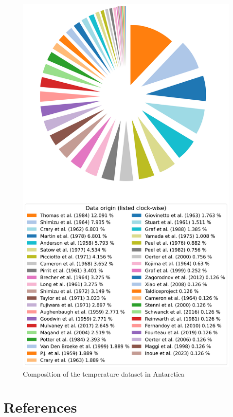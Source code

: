 \documentclass[journal abbreviation, manuscript]{copernicus}
\begin{document}
\begin{figure}[!htb]
\caption{Composition of the temperature dataset in Antarctica}
\centering
\includegraphics[scale=0.4]{figures/temperature_dataset_composition_antarctica.png}
\end{figure}

\FloatBarrier
\section{References}


\end{document}
